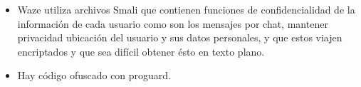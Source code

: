 \begin{itemize}
\item Waze utiliza archivos Smali que contienen funciones de confidencialidad de la información de cada usuario como son los mensajes por chat, mantener privacidad ubicación del usuario y sus datos personales, y que estos viajen encriptados y que sea difícil obtener ésto en  texto plano.
\item Hay código ofuscado con  proguard.
\end{itemize}




